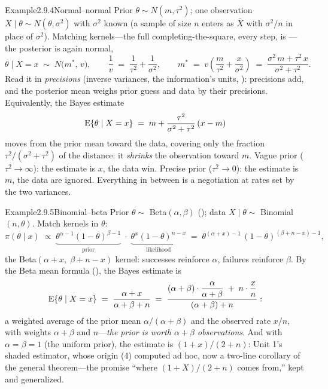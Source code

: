 \documentclass[main.tex]{subfiles}
\begin{document}
\begin{ObjL}{Example}{2.9.4}{Normal--normal}
Prior $\theta\sim N(m,\tau^2)$; one observation $X\mid\theta\sim N(\theta,\sigma^2)$ with
$\sigma^2$ known (a sample of size $n$ enters as $\bar X$ with $\sigma^2/n$ in place of
$\sigma^2$). Matching kernels---the full completing-the-square, every step, is
---the posterior is again normal,
\[ \theta \mid X=x \;\sim\; N\big( m^{*},\, v \big), \qquad
   \frac{1}{v} \;=\; \frac{1}{\tau^2}+\frac{1}{\sigma^2} , \qquad
   m^{*} \;=\; v\left( \frac{m}{\tau^2} + \frac{x}{\sigma^2} \right)
   \;=\; \frac{\sigma^2\, m + \tau^2\, x}{\sigma^2+\tau^2} . \]
Read it in \emph{precisions} (inverse variances, the information's units,
): precisions add, and the posterior mean weighs prior guess and data by their
precisions. Equivalently, the Bayes estimate
\[ \mathrm{E}\{\theta\mid X=x\} \;=\; m + \frac{\tau^2}{\sigma^2+\tau^2}\,(x-m) \]
moves from the prior mean toward the data, covering only the fraction
$\tau^2/(\sigma^2+\tau^2)$ of the distance: it \emph{shrinks} the observation toward $m$.
Vague prior ($\tau^2\to\infty$): the estimate is $x$, the data win. Precise prior
($\tau^2\to0$): the estimate is $m$, the data are ignored. Everything in between is a
negotiation at rates set by the two variances.
\end{ObjL}

\begin{ObjL}{Example}{2.9.5}{Binomial--beta}
Prior $\theta\sim$ Beta$(\alpha,\beta)$ (); data $X\mid\theta\sim$
Binomial$(n,\theta)$. Match kernels in $\theta$:
\[ \pi(\theta\mid x) \;\propto\;
   \underbrace{\theta^{\alpha-1}(1-\theta)^{\beta-1}}_{\text{prior}}\;\cdot\;
   \underbrace{\theta^{x}(1-\theta)^{n-x}}_{\text{likelihood}}
   \;=\; \theta^{(\alpha+x)-1}\,(1-\theta)^{(\beta+n-x)-1} , \]
the Beta$(\alpha+x,\;\beta+n-x)$ kernel: successes reinforce $\alpha$, failures reinforce
$\beta$. By the Beta mean formula (), the Bayes estimate is
\[ \mathrm{E}\{\theta\mid X=x\} \;=\; \frac{\alpha+x}{\alpha+\beta+n}
   \;=\; \frac{(\alpha+\beta)\cdot\dfrac{\alpha}{\alpha+\beta} \;+\; n\cdot\dfrac{x}{n}}
   {(\alpha+\beta)+n} : \]
a weighted average of the prior mean $\alpha/(\alpha+\beta)$ and the observed rate $x/n$,
with weights $\alpha+\beta$ and $n$---\emph{the prior is worth $\alpha+\beta$
observations}. And with $\alpha=\beta=1$ (the uniform prior), the estimate is
$(1+x)/(2+n)$: Unit 1's shaded estimator, whose origin (4) computed ad hoc, now
a two-line corollary of the general theorem---the promise ``where $(1+X)/(2+n)$ comes
from,'' kept and generalized.
\end{ObjL}
\end{document}
